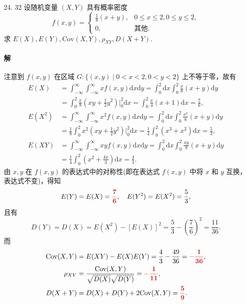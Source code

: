 \documentclass[11pt, UTF8]{ctexart}
\newcommand{\ans}[1]{\mathbf{\color{fred}#1}}
\begin{document}
\vspace{1.5em}

\begin{problem}{2}{4. 32}
设随机变量 $(X,Y)$ 具有概率密度
\[ f(x,y) = \begin{cases} \frac{1}{8}(x+y), & 0 \leqslant x \leqslant 2, 0 \leqslant y \leqslant 2, \\ 0, & \text{其他.} \end{cases} \]
求 $E(X),E(Y),\text{Cov}(X,Y),\rho_{XY},D(X+Y)$.
\end{problem}

\paragraph{\color{fblue}解}
注意到 $f(x,y)$ 在区域 $G: \{(x,y) \mid 0 < x < 2, 0 < y < 2\}$ 上不等于零，故有
\begin{align*}
E(X) &= \int_{-\infty}^{\infty}\int_{-\infty}^{\infty} xf(x,y)\mathrm{d}x\mathrm{d}y = \int_0^2 \mathrm{d}x\int_0^2 \frac{x}{8}(x+y)\mathrm{d}y \\
&= \int_0^2 \frac{x}{8}\left(xy + \frac{1}{2}y^2\right) \Bigg|_0^2 \mathrm{d}x = \int_0^2 \frac{x}{4}(x+1)\mathrm{d}x = \frac{7}{6}, \\
E(X^2) &= \int_{-\infty}^{\infty}\int_{-\infty}^{\infty} x^2f(x,y)\mathrm{d}x\mathrm{d}y = \int_0^2 \mathrm{d}x\int_0^2 \frac{x^2}{8}(x+y)\mathrm{d}y \\
&= \frac{1}{8}\int_0^2 x^2\left(xy + \frac{1}{2}y^2\right) \Bigg|_0^2 \mathrm{d}x = \frac{1}{4}\int_0^2 (x^3+x^2)\mathrm{d}x = \frac{5}{3}, \\
E(XY) &= \int_{-\infty}^{\infty}\int_{-\infty}^{\infty} xyf(x,y)\mathrm{d}x\mathrm{d}y = \int_0^2 \mathrm{d}x\int_0^2 \frac{xy}{8}(x+y)\mathrm{d}y \\
&= \frac{1}{4}\int_0^2 \left(x^2 + \frac{4x}{3}\right)\mathrm{d}x = \frac{4}{3}.
\end{align*}
由 $x,y$ 在 $f(x,y)$ 的表达式中的对称性(即在表达式 $f(x,y)$ 中将 $x$ 和 $y$ 互换，表达式不变)，得知
\[ E(Y) = E(X) = \ans{\frac{7}{6}}, \quad E(Y^2) = E(X^2) = \frac{5}{3}, \]
且有 
\[ D(Y) = D(X) = E(X^2) - [E(X)]^2 = \frac{5}{3} - \left(\frac{7}{6}\right)^2 = \frac{11}{36}. \]
而 
\begin{align*}
\text{Cov}(X,Y) &= E(XY) - E(X)E(Y) = \frac{4}{3} - \frac{49}{36} = \ans{-\frac{1}{36}}, \\
\rho_{XY} &= \frac{\text{Cov}(X,Y)}{\sqrt{D(X)}\sqrt{D(Y)}} = \ans{-\frac{1}{11}}, \\
D(X+Y) &= D(X) + D(Y) + 2\text{Cov}(X,Y) = \ans{\frac{5}{9}}.
\end{align*}
\end{document}
